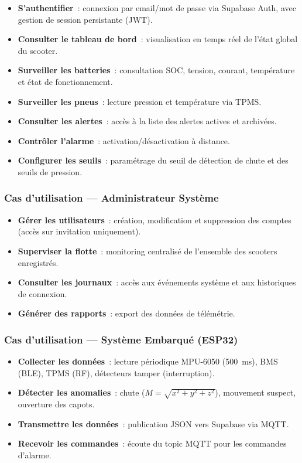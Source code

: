 \documentclass[12pt, a4paper]{report}
\begin{document}
\begin{itemize}
  \item \textbf{S'authentifier}~: connexion par email/mot de passe via Supabase Auth,
        avec gestion de session persistante (JWT).
  \item \textbf{Consulter le tableau de bord}~: visualisation en temps réel de
        l'état global du scooter.
  \item \textbf{Surveiller les batteries}~: consultation SOC, tension, courant,
        température et état de fonctionnement.
  \item \textbf{Surveiller les pneus}~: lecture pression et température via TPMS.
  \item \textbf{Consulter les alertes}~: accès à la liste des alertes actives et
        archivées.
  \item \textbf{Contrôler l'alarme}~: activation/désactivation à distance.
  \item \textbf{Configurer les seuils}~: paramétrage du seuil de détection de chute
        et des seuils de pression.
\end{itemize}

\subsubsection{Cas d'utilisation — Administrateur Système}

\begin{itemize}
  \item \textbf{Gérer les utilisateurs}~: création, modification et suppression
        des comptes (accès sur invitation uniquement).
  \item \textbf{Superviser la flotte}~: monitoring centralisé de l'ensemble des
        scooters enregistrés.
  \item \textbf{Consulter les journaux}~: accès aux événements système et aux
        historiques de connexion.
  \item \textbf{Générer des rapports}~: export des données de télémétrie.
\end{itemize}

\subsubsection{Cas d'utilisation — Système Embarqué (ESP32)}

\begin{itemize}
  \item \textbf{Collecter les données}~: lecture périodique MPU-6050 (500~ms),
        BMS (BLE), TPMS (RF), détecteurs tamper (interruption).
  \item \textbf{Détecter les anomalies}~: chute ($M = \sqrt{x^2 + y^2 + z^2}$),
        mouvement suspect, ouverture des capots.
  \item \textbf{Transmettre les données}~: publication JSON vers Supabase via MQTT.
  \item \textbf{Recevoir les commandes}~: écoute du topic MQTT pour les commandes
        d'alarme.
\end{itemize}
\end{document}
